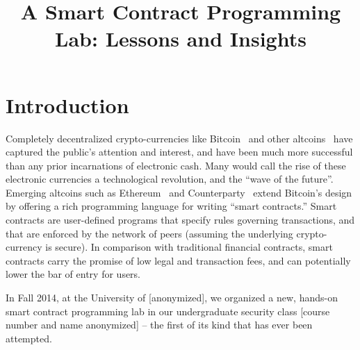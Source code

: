 \documentclass[10pt,twocolumn,letterpaper]{article}
\newcommand{\elaine}[1]{{\color{red}{[elaine: #1]}}}
\begin{document}
\title{A Smart Contract Programming Lab: Lessons and Insights}

\date{}
\maketitle


\newpage
\section{Introduction}

Completely decentralized crypto-currencies like Bitcoin~\cite{satoshi-bitcoin}
and other altcoins~\cite{altcoins}
have captured the public's attention and interest, 
and have been much more successful than any prior incarnations of electronic
cash. Many would call the rise 
of these electronic currencies a technological revolution, and the ``wave of
the future''.
Emerging altcoins such as Ethereum~\cite{ethereum} and Counterparty~\cite{counterparty}
extend Bitcoin's design by offering a rich programming language for 
writing ``smart contracts.'' Smart
contracts are user-defined programs that specify rules 
governing transactions, and that are enforced by
the network of peers (assuming the underlying crypto-currency is secure). 
In comparison with traditional
financial contracts, smart contracts carry the promise of low legal 
and transaction fees, and can potentially
lower the bar of entry for users.

In Fall 2014, at the University of [anonymized], 
we organized a new, hands-on
smart contract programming lab in our undergraduate security
class [course number and name anonymized] -- the first of its
kind that has ever been attempted.



\end{document}
